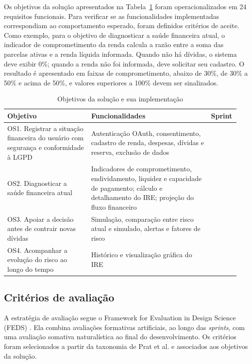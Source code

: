 \documentclass[portuguese]{sbc2025}%
\begin{document}
Os objetivos da solução apresentados na Tabela~\ref{tab:objetivos_solucao} foram operacionalizados em 24 requisitos funcionais. Para verificar se as funcionalidades implementadas correspondiam ao comportamento esperado, foram definidos critérios de aceite. Como exemplo, para o objetivo de diagnosticar a saúde financeira atual, o indicador de comprometimento da renda calcula a razão entre a soma das parcelas ativas e a renda líquida informada. Quando não há dívidas, o sistema deve exibir 0\%; quando a renda não foi informada, deve solicitar seu cadastro. O resultado é apresentado em faixas de comprometimento, abaixo de 30\%, de 30\% a 50\% e acima de 50\%, e valores superiores a 100\% devem ser sinalizados.

\begin{table}[!ht]
\caption{Objetivos da solução e sua implementação}
\centering
\footnotesize
\begin{tabular}{@{} >{\raggedright\arraybackslash}p{0.35\linewidth} >{\raggedright\arraybackslash}p{0.50\linewidth} >{\raggedright\arraybackslash}p{0.10\linewidth} @{}}
\hline\hline
\textbf{Objetivo} & \textbf{Funcionalidades} & \textbf{Sprint} \\
\hline
OS1. Registrar a situação financeira do usuário com segurança e conformidade à LGPD & Autenticação OAuth, consentimento, cadastro de renda, despesas, dívidas e reserva, exclusão de dados & 1 \\
OS2. Diagnosticar a saúde financeira atual & Indicadores de comprometimento, endividamento, liquidez e capacidade de pagamento; cálculo e detalhamento do IRE; projeção do fluxo financeiro & 2 \\
OS3. Apoiar a decisão antes de contrair novas dívidas & Simulação, comparação entre risco atual e simulado, alertas e fatores de risco & 3 \\
OS4. Acompanhar a evolução do risco ao longo do tempo & Histórico e visualização gráfica do IRE & 4 \\
\hline\hline
\end{tabular}
\label{tab:objetivos_solucao}
\end{table}


\subsection{Critérios de avaliação}

A estratégia de avaliação segue o Framework for Evaluation in Design Science (FEDS) \citep{venable2016}. Ela combina avaliações formativas artificiais, ao longo das \textit{sprints}, com uma avaliação somativa naturalística ao final do desenvolvimento. Os critérios foram selecionados a partir da taxonomia de Prat et al. \citeyearpar{prat2015} e associados aos objetivos da solução.
\end{document}
